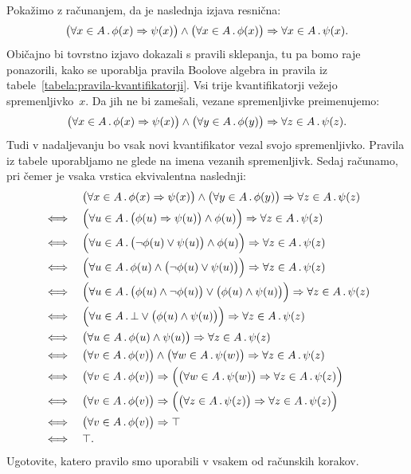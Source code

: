 \begin{zgled}
  Pokažimo z računanjem, da je naslednja izjava resnična:
  \begin{equation*}
    \bigl(\forall x \in A \,.\, \phi(x) \Rightarrow \psi(x)\bigr) \land \bigl(\forall x \in A \,.\, \phi(x)\bigr) \Rightarrow \forall x \in A \,.\, \psi(x).
  \end{equation*}
  Običajno bi tovrstno izjavo dokazali s pravili sklepanja, tu pa bomo raje ponazorili,
  kako se uporablja pravila Boolove algebra in pravila iz tabele~\ref{tabela:pravila-kvantifikatorji}.
  Vsi trije kvantifikatorji vežejo spremenljivko~$x$.
  Da jih ne bi zamešali, vezane spremenljivke preimenujemo:
  \begin{equation*}
    \bigl(\forall x \in A \,.\, \phi(x) \Rightarrow \psi(x)\bigr) \land \bigl(\forall y \in A \,.\, \phi(y)\bigr) \Rightarrow \forall z \in A \,.\, \psi(z).
  \end{equation*}
  Tudi v nadaljevanju bo vsak novi kvantifikator vezal svojo spremenljivko.
  Pravila iz tabele uporabljamo ne glede na imena vezanih spremenljivk.
  Sedaj računamo, pri čemer je vsaka vrstica ekvivalentna naslednji:
  \begin{align*}
    & \bigl(\forall x \in A \,.\, \phi(x) \Rightarrow \psi(x)\bigr) \land \bigl(\forall y \in A \,.\, \phi(y)\bigr) \Rightarrow \forall z \in A \,.\, \psi(z) \\
    \iff\quad & \Bigl(\forall u \in A \,.\, \bigl(\phi(u) \Rightarrow \psi(u)\bigr) \land \phi(u)\Bigr) \Rightarrow \forall z \in A \,.\, \psi(z) \\
    \iff\quad & \Bigl(\forall u \in A \,.\, \bigl(\neg\phi(u) \lor \psi(u)\bigr) \land \phi(u)\Bigr) \Rightarrow \forall z \in A \,.\, \psi(z) \\
    \iff\quad & \Bigl(\forall u \in A \,.\, \phi(u) \land \bigl(\neg\phi(u) \lor \psi(u)\bigr)\Bigr) \Rightarrow \forall z \in A \,.\, \psi(z) \\
    \iff\quad & \Bigl(\forall u \in A \,.\, \bigl(\phi(u) \land \neg\phi(u)\bigr) \lor \bigl(\phi(u) \land \psi(u)\bigr)\Bigr) \Rightarrow \forall z \in A \,.\, \psi(z) \\
    \iff\quad & \Bigl(\forall u \in A \,.\, \bot \lor \bigl(\phi(u) \land \psi(u)\bigr)\Bigr) \Rightarrow \forall z \in A \,.\, \psi(z) \\
    \iff\quad & \bigl(\forall u \in A \,.\, \phi(u) \land \psi(u)\bigr) \Rightarrow \forall z \in A \,.\, \psi(z) \\
    \iff\quad & \bigl(\forall v \in A \,.\, \phi(v)\bigr) \land \bigl(\forall w \in A \,.\, \psi(w)\bigr) \Rightarrow \forall z \in A \,.\, \psi(z) \\
    \iff\quad & \bigl(\forall v \in A \,.\, \phi(v)\bigr) \Rightarrow \Bigl(\bigl(\forall w \in A \,.\, \psi(w)\bigr) \Rightarrow \forall z \in A \,.\, \psi(z)\Bigr) \\
    \iff\quad & \bigl(\forall v \in A \,.\, \phi(v)\bigr) \Rightarrow \Bigl(\bigl(\forall z \in A \,.\, \psi(z)\bigr) \Rightarrow \forall z \in A \,.\, \psi(z)\Bigr) \\
    \iff\quad & \bigl(\forall v \in A \,.\, \phi(v)\bigr) \Rightarrow \top \\
    \iff\quad & \top.
  \end{align*}
  Ugotovite, katero pravilo smo uporabili v vsakem od računskih korakov.
\end{zgled}

